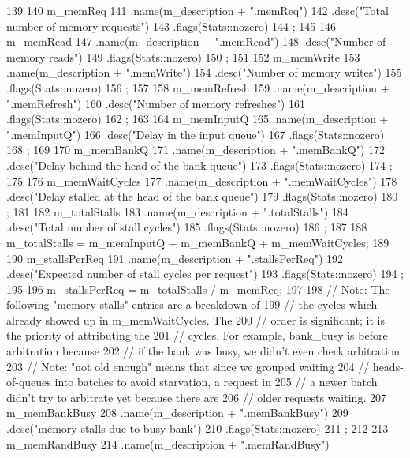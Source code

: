 \begin{DoxyCode}
139 {
140     m_memReq
141         .name(m_description + ".memReq")
142         .desc("Total number of memory requests")
143         .flags(Stats::nozero)
144         ;
145 
146     m_memRead
147         .name(m_description + ".memRead")
148         .desc("Number of memory reads")
149         .flags(Stats::nozero)
150         ;
151 
152     m_memWrite
153         .name(m_description + ".memWrite")
154         .desc("Number of memory writes")
155         .flags(Stats::nozero)
156         ;
157 
158     m_memRefresh
159         .name(m_description + ".memRefresh")
160         .desc("Number of memory refreshes")
161         .flags(Stats::nozero)
162         ;
163 
164     m_memInputQ
165         .name(m_description + ".memInputQ")
166         .desc("Delay in the input queue")
167         .flags(Stats::nozero)
168         ;
169 
170     m_memBankQ
171         .name(m_description + ".memBankQ")
172         .desc("Delay behind the head of the bank queue")
173         .flags(Stats::nozero)
174         ;
175 
176     m_memWaitCycles
177         .name(m_description + ".memWaitCycles")
178         .desc("Delay stalled at the head of the bank queue")
179         .flags(Stats::nozero)
180         ;
181 
182     m_totalStalls
183         .name(m_description + ".totalStalls")
184         .desc("Total number of stall cycles")
185         .flags(Stats::nozero)
186         ;
187 
188     m_totalStalls = m_memInputQ + m_memBankQ + m_memWaitCycles;
189 
190     m_stallsPerReq
191         .name(m_description + ".stallsPerReq")
192         .desc("Expected number of stall cycles per request")
193         .flags(Stats::nozero)
194         ;
195 
196     m_stallsPerReq = m_totalStalls / m_memReq;
197 
198     // Note: The following "memory stalls" entries are a breakdown of
199     // the cycles which already showed up in m_memWaitCycles.  The
200     // order is significant; it is the priority of attributing the
201     // cycles.  For example, bank_busy is before arbitration because
202     // if the bank was busy, we didn't even check arbitration.
203     // Note: "not old enough" means that since we grouped waiting
204     // heads-of-queues into batches to avoid starvation, a request in
205     // a newer batch didn't try to arbitrate yet because there are
206     // older requests waiting.
207     m_memBankBusy
208         .name(m_description + ".memBankBusy")
209         .desc("memory stalls due to busy bank")
210         .flags(Stats::nozero)
211         ;
212 
213     m_memRandBusy
214         .name(m_description + ".memRandBusy")
}
\end{DoxyCode}
